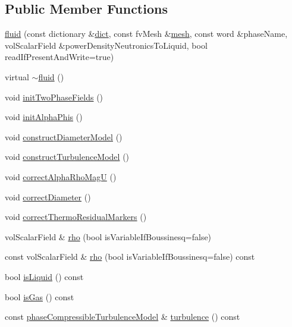 \subsection*{Public Member Functions}
\begin{DoxyCompactItemize}
\item 
\hyperlink{classFoam_1_1fluid_a74a7690dc5d0c7f348b26312c2135798}{fluid} (const dictionary \&\hyperlink{classFoam_1_1phaseBase_a19650e729ef6a0899b8fbe25f5238728}{dict}, const fv\+Mesh \&\hyperlink{classFoam_1_1phaseBase_a470f06cfb9b6ee887cd85d63de275607}{mesh}, const word \&phase\+Name, vol\+Scalar\+Field \&power\+Density\+Neutronics\+To\+Liquid, bool read\+If\+Present\+And\+Write=true)
\item 
virtual \hyperlink{classFoam_1_1fluid_afe11f43cbda8f4228a1464d5b3445d6b}{$\sim$fluid} ()
\item 
void \hyperlink{classFoam_1_1fluid_a1c4127c040e8d9d789949b2971ba70c4}{init\+Two\+Phase\+Fields} ()
\item 
void \hyperlink{classFoam_1_1fluid_a6a22d6973938e79b73ec99f5ca83669f}{init\+Alpha\+Phis} ()
\item 
void \hyperlink{classFoam_1_1fluid_ad171d939558972a1b8e8d3443913634f}{construct\+Diameter\+Model} ()
\item 
void \hyperlink{classFoam_1_1fluid_a8d39324ca54771714eb694b23830bfa3}{construct\+Turbulence\+Model} ()
\item 
void \hyperlink{classFoam_1_1fluid_afaf740ec72be3307620d4d4bfc4bf36a}{correct\+Alpha\+Rho\+MagU} ()
\item 
void \hyperlink{classFoam_1_1fluid_a0f9920f17070c8ac7104fc16d6aab6df}{correct\+Diameter} ()
\item 
void \hyperlink{classFoam_1_1fluid_a33ae4563d9ea852790eef6cc0685dfdd}{correct\+Thermo\+Residual\+Markers} ()
\item 
vol\+Scalar\+Field \& \hyperlink{classFoam_1_1fluid_aa98f238e60845f1db57273af0d3bf05f}{rho} (bool is\+Variable\+If\+Boussinesq=false)
\item 
const vol\+Scalar\+Field \& \hyperlink{classFoam_1_1fluid_a2504e796853f97cadf33aff94e7eb5b2}{rho} (bool is\+Variable\+If\+Boussinesq=false) const
\item 
bool \hyperlink{classFoam_1_1fluid_ab1b1db98a9d988bae8944437fb1b8d21}{is\+Liquid} () const
\item 
bool \hyperlink{classFoam_1_1fluid_a48121b56e3e6bef6fa30d0a603ced655}{is\+Gas} () const
\item 
const \hyperlink{namespaceFoam_a21fdbb0b53653a278781d894a16c8a88}{phase\+Compressible\+Turbulence\+Model} \& \hyperlink{classFoam_1_1fluid_a5c1d5898dbbb21dbbd6dd97b87710b4d}{turbulence} () const

\end{DoxyCompactItemize}
